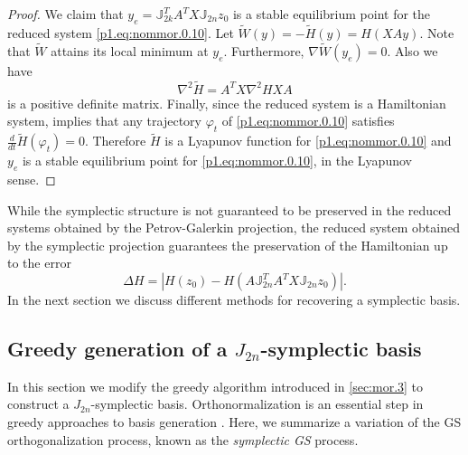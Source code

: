 {{\begin{proof}
We claim that $y_e = \mathbb J_{2k}^T A^T X \mathbb J_{2n} z_0$ is a stable equilibrium point for the reduced system \eqref{p1.eq:nommor.0.10}. Let $\tilde W (y) = -\tilde H (y) = H(XAy)$. Note that $\tilde W$ attains its local minimum at $y_e$. Furthermore, $\nabla \tilde W(y_e) = 0$. Also we have
\begin{equation}
	\nabla^2 \tilde H = A^T X \nabla^2 H X A
\end{equation}
is a positive definite matrix. Finally, since the reduced system is a Hamiltonian system,  implies that any trajectory $\varphi_t$ of \eqref{p1.eq:nommor.0.10} satisfies $\frac{d}{dt} \tilde H(\varphi_t) = 0$. Therefore $\tilde H$ is a Lyapunov function for \eqref{p1.eq:nommor.0.10} and $y_e$ is a stable equilibrium point for \eqref{p1.eq:nommor.0.10}, in the Lyapunov sense.

\end{proof}
}

While the symplectic structure is not guaranteed to be preserved in the reduced systems obtained by the Petrov-Galerkin projection, the reduced system obtained by the symplectic projection guarantees the preservation of the Hamiltonian up to the error
\begin{equation}
	\Delta H = | H(z_0) - H( A \mathbb J_{2n}^T A^T X \mathbb J_{2n} z_0) |.
\end{equation}
In the next section we discuss  different methods for recovering a symplectic basis.
}

\subsection{Greedy generation of a $J_{2n}$-symplectic basis} \label{sec:normmor.2}
In this section we modify the greedy algorithm introduced in \cref{sec:mor.3} to construct a $J_{2n}$-symplectic basis. Orthonormalization is an essential step in greedy approaches to basis generation \cite{hesthaven2015certified,quarteroni2015reduced}. Here, we summarize a variation of the GS orthogonalization process, known as the \emph{symplectic GS} process.


